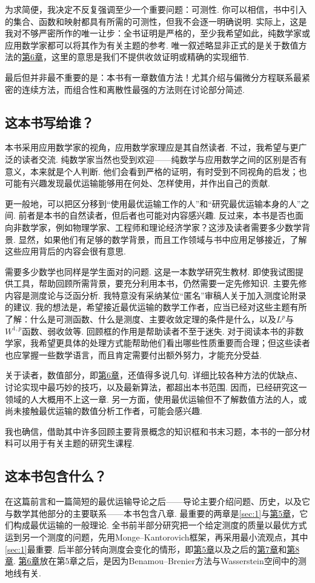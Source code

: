 为求简便，我决定不反复强调至少一个重要问题：可测性. 你可以相信，书中引入的集合、函数和映射都具有所需的可测性，但我不会逐一明确说明. 实际上，这是我对不够严密所作的唯一让步：全书证明是严格的，至少我希望如此，纯数学家或应用数学家都可以将其作为有关主题的参考. 唯一叙述略显非正式的是关于数值方法的\hyperref[sec:6]{第6章}，这里的意思是我们不提供收敛证明或精确的实现细节.

最后但并非最不重要的是：本书有一章数值方法！尤其介绍与偏微分方程联系最紧密的连续方法，而组合性和离散性最强的方法则在讨论部分简述.

\subsection*{这本书写给谁？}
本书采用应用数学家的视角，应用数学家理应是其自然读者. 不过，我希望与更广泛的读者交流. 纯数学家当然也受到欢迎——纯数学与应用数学之间的区别是否有意义，本来就是个人判断. 他们会看到严格的证明，有时受到不同视角的启发；也可能有兴趣发现最优运输能够用在何处、怎样使用，并作出自己的贡献.

更一般地，可以把区分移到“使用最优运输工作的人”和“研究最优运输本身的人”之间. 前者是本书的自然读者，但后者也可能对内容感兴趣. 反过来，本书是否也面向非数学家，例如物理学家、工程师和理论经济学家？这涉及读者需要多少数学背景. 显然，如果他们有足够的数学背景，而且工作领域与书中应用足够接近，了解这些应用背后的内容会很有意思.

需要多少数学也同样是学生面对的问题. 这是一本数学研究生教材. 即使我试图提供工具，帮助回顾所需背景，要充分利用本书，仍然需要一定先修知识. 主要先修内容是测度论与泛函分析. 我特意没有采纳某位“匿名”审稿人关于加入测度论附录的建议. 我的想法是，希望接近最优运输的数学工作者，应当已经对这些主题有所了解：什么是可测函数、什么是测度、主要收敛定理的条件是什么，以及$L^p$与$W^{1,p}$函数、弱收敛等. 回顾框的作用是帮助读者不至于迷失. 对于阅读本书的非数学家，我希望更具体的处理方式能帮助他们看出哪些性质重要而合理；但这些读者也应掌握一些数学语言，而且肯定需要付出额外努力，才能充分受益.

关于读者，数值部分，即\hyperref[sec:6]{第6章}，还值得多说几句. 详细比较各种方法的优缺点、讨论实现中最巧妙的技巧，以及最新算法，都超出本书范围. 因而，已经研究这一领域的人大概用不上这一章. 另一方面，使用最优运输但不了解数值方法的人，或尚未接触最优运输的数值分析工作者，可能会感兴趣.

我也确信，借助其中许多回顾主要背景概念的知识框和书末习题，本书的一部分材料可以用于有关主题的研究生课程.

\subsection*{这本书包含什么？}
在这篇前言和一篇简短的最优运输导论之后——导论主要介绍问题、历史，以及它与数学其他部分的主要联系——本书包含八章. 最重要的两章是\autoref{sec:1}与\hyperref[sec:5]{第5章}，它们构成最优运输的一般理论. 全书前半部分研究把一个给定测度的质量以最优方式运到另一个测度的问题，先用Monge--Kantorovich框架，再采用最小流观点，其中\autoref{sec:1}最重要. 后半部分转向测度会变化的情形，即\hyperref[sec:5]{第5章}以及之后的\hyperref[sec:7]{第7章}和\hyperref[sec:8]{第8章}. \hyperref[sec:6]{第6章}放在第5章之后，是因为Benamou--Brenier方法与Wasserstein空间中的测地线有关.


